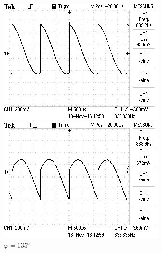 \begin{figure}[!h]
\begin{minipage}[t]{0.3\textwidth}
\includegraphics[width=\textwidth]{Bilder/Rausch165.jpg}
\caption{$\varphi = 90\si{\degree}$}
\label{fig:9}
\end{minipage}
\hspace{10pt}
\vspace{5pt}
\begin{minipage}[t]{0.3\textwidth}
\includegraphics[width=\textwidth]{Bilder/Rausch240.jpg}
\caption{$\varphi = 135\si{\degree}$}
\label{fig:10}
\end{minipage}
\hspace{12pt}
\vspace{5pt}
\begin{minipage}[t]{0.3\textwidth}

\end{minipage}
\end{figure}
